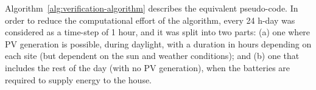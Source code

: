 %
%
%
% 
%
%
%

Algorithm~\ref{alg:verification-algorithm} describes the equivalent pseudo-code. %
In order to reduce the computational effort of the algorithm,
every 24 h-day was considered as a time-step of 1 hour, and it was split into two parts: (a) one where PV generation is possible, during daylight, with a duration in hours depending on each site (but dependent on the sun and weather conditions); and (b) one that includes the rest of the day (with no PV generation), when the batteries are required to supply energy to the house.

